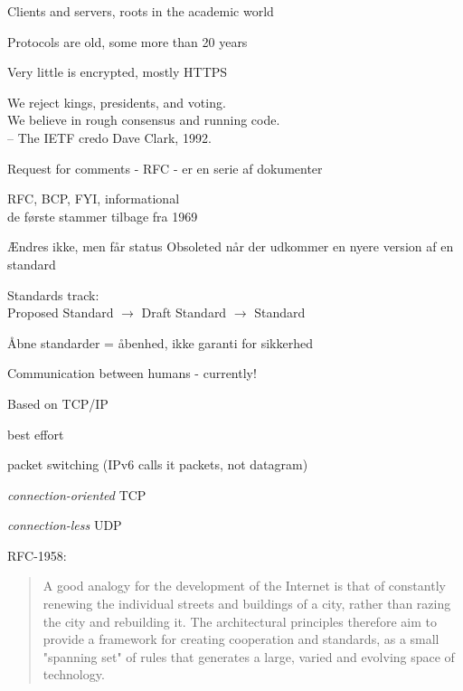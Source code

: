 \documentclass[Screen16to9,17pt]{foils}
\begin{document}

\begin{list1}
\item Clients and servers, roots in the academic world
\item Protocols are old, some more than 20 years
\item Very little is encrypted, mostly HTTPS
\end{list1}


{\hlkbig \color{titlecolor}
We reject kings, presidents, and voting.\\
We believe in rough consensus and running code.\\
-- The IETF credo Dave Clark, 1992.}

\begin{list1}
\item Request for comments - RFC - er en serie af dokumenter
\item RFC, BCP, FYI, informational\\
de første stammer tilbage fra 1969
\item Ændres ikke, men får status Obsoleted når der udkommer en nyere
  version af en standard
\item Standards track:\\
Proposed Standard $\rightarrow$ Draft Standard $\rightarrow$ Standard
\item  Åbne standarder = åbenhed, ikke garanti for sikkerhed
\end{list1}


\begin{list1}
\item Communication between humans - currently!
\item Based on TCP/IP
\begin{list2}
\item best effort
\item packet switching (IPv6 calls it packets, not datagram)
\item \emph{connection-oriented} TCP
\item \emph{connection-less} UDP
\end{list2}
\end{list1}

RFC-1958:
\begin{quote}
 A good analogy for the development of the Internet is that of
 constantly renewing the individual streets and buildings of a city,
 rather than razing the city and rebuilding it. The architectural
 principles therefore aim to provide a framework for creating
 cooperation and standards, as a small "spanning set" of rules that
 generates a large, varied and evolving space of technology.
\end{quote}
\end{document}
